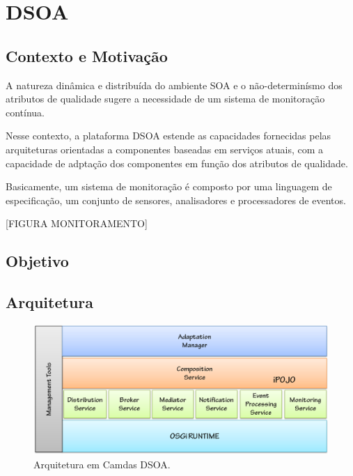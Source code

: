\chapter{DSOA}
\label{ch:3}

\section{Contexto e Motivação}


A natureza dinâmica e distribuída do ambiente SOA e o não-determinísmo dos atributos de qualidade sugere a necessidade de um sistema de monitoração contínua.

Nesse contexto, a plataforma DSOA estende as capacidades fornecidas pelas arquiteturas orientadas a componentes baseadas em serviços atuais, com a capacidade de adptação dos componentes em função dos atributos de qualidade.

Basicamente, um sistema de monitoração é composto por uma linguagem de especificação, um conjunto de sensores, analisadores e processadores de eventos.

[FIGURA MONITORAMENTO]



\section{Objetivo}

\section{Arquitetura}
\label{sec:dsoa_arch}

\begin{figure}[htp]
\centering
\includegraphics[width=13cm]{chapters/chapter3/dsoa-arch.png}
\caption[Arquitetura em Camdas DSOA]{Arquitetura em Camdas DSOA.}
\label{fig:proposal}
\end{figure}


